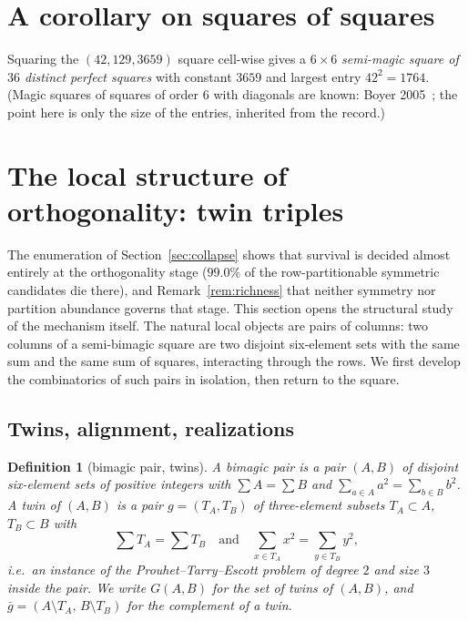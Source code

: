 \documentclass[11pt]{article}
\newtheorem{definition}[theorem]{Definition}
\begin{document}
\section{A corollary on squares of squares}

Squaring the $(42,129,3659)$ square cell-wise gives a $6\times6$
\emph{semi-magic square of $36$ distinct perfect squares} with constant
$3659$ and largest entry $42^2=1764$. (Magic squares of squares of order
$6$ with diagonals are known: Boyer 2005~\cite{boyer2005}; the point
here is only the size of the entries, inherited from the record.)

\section{The local structure of orthogonality: twin triples}
\label{sec:twins}

The enumeration of Section~\ref{sec:collapse} shows that survival is
decided almost entirely at the orthogonality stage ($99.0\%$ of the
row-partitionable symmetric candidates die there), and
Remark~\ref{rem:richness} that neither symmetry nor partition
abundance governs that stage. This section opens the structural study
of the mechanism itself. The natural local objects are pairs of
columns: two columns of a semi-bimagic square are two disjoint
six-element sets with the same sum and the same sum of squares,
interacting through the rows. We first develop the combinatorics of
such pairs in isolation, then return to the square.

\subsection{Twins, alignment, realizations}

\begin{definition}[bimagic pair, twins]\label{def:twin}
A \emph{bimagic pair} is a pair $(A,B)$ of disjoint six-element sets
of positive integers with $\sum A=\sum B$ and $\sum_{a\in A}a^2
=\sum_{b\in B}b^2$. A \emph{twin} of $(A,B)$ is a pair
$g=(T_A,T_B)$ of three-element subsets $T_A\subset A$,
$T_B\subset B$ with
\[
\textstyle\sum T_A=\sum T_B \quad\text{and}\quad
\sum_{x\in T_A}x^2=\sum_{y\in T_B}y^2,
\]
i.e.\ an instance of the Prouhet--Tarry--Escott problem of degree $2$
and size $3$~\cite{pte} inside the pair. We write $G(A,B)$ for the
set of twins of $(A,B)$, and
$\bar g=(A\setminus T_A,\,B\setminus T_B)$ for the \emph{complement}
of a twin.
\end{definition}
\end{document}
